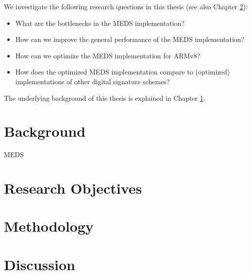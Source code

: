 \documentclass[11pt,a4paper]{report}
\begin{document}
We investigate the following research questions in this thesis (see also Chapter \ref{ch:researchobjectives}):
\begin{itemize}
    \item What are the bottlenecks in the MEDS implementation?
    \item How can we improve the general performance of the MEDS implementation?
    \item How can we optimize the MEDS implementation for ARMv8?
    \item How does the optimized MEDS implementation compare to (optimized) implementations of other digital signature schemes?
\end{itemize}

The underlying background of this thesis is explained in Chapter \ref{ch:background}.

\chapter{Background}
\label{ch:background}
MEDS \cite{chou2023take}

\chapter{Research Objectives}
\label{ch:researchobjectives}

\chapter{Methodology}
\label{ch:methodology}

\chapter{Discussion}
\label{ch:discussion}
\end{document}
